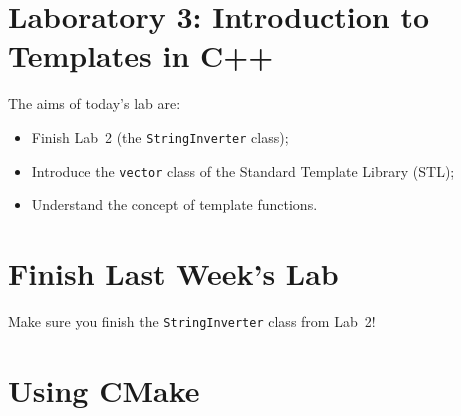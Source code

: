
  
\section*{Laboratory 3: Introduction to Templates in C++}

%
%
%
%    
%    

The aims of today's lab are:
\begin{itemize}
\item Finish Lab~2 (the \verb+StringInverter+ class);
\item Introduce the \verb+vector+ class of the Standard Template Library (STL);
\item Understand the concept of template functions. 
\end{itemize}

\setcounter{section}{-1}
\section{Finish Last Week's Lab}

Make sure you finish the \verb+StringInverter+ class from Lab~2!

\section{Using CMake}


